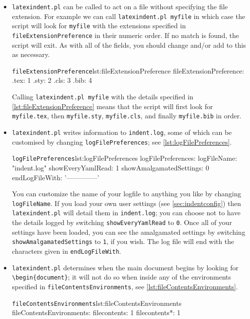 \documentclass[11pt]{article}
\newcommand{\verbitem}[1]{\small\PVerb{#1}}
\begin{document}
\begin{itemize}
	\item[\verbitem{fileExtensionPreference}] \lstinline!latexindent.pl! can be called to
	      act on a file without
	      specifying the file extension.  For example we can call \lstinline!latexindent.pl myfile!
	      in which case the script will look for \lstinline!myfile! with the extensions
	      specified in \lstinline!fileExtensionPreference! in their numeric order. If
	      no match is found, the script will exit. As with all of the fields, you should
	      change and/or add to this as necessary.
	      \begin{cmhlistings}[style=yaml]{\lstinline!fileExtensionPreference!}{lst:fileExtensionPreference}
fileExtensionPreference:
    .tex: 1
    .sty: 2
    .cls: 3
    .bib: 4
	\end{cmhlistings}
	Calling \lstinline!latexindent.pl myfile! with the details specified in \cref{lst:fileExtensionPreference}
	means that the script will first look for \lstinline!myfile.tex!, then \lstinline!myfile.sty!, \lstinline!myfile.cls!, 
    and finally \lstinline!myfile.bib! in order.
\item[\verbitem{logFilePreferences}] 
  \lstinline!latexindent.pl! writes information to \lstinline!indent.log!, some 
  of which can be customised by changing \lstinline!logFilePreferences!; see \cref{lst:logFilePreferences}.
\begin{cmhlistings}[style=yaml]{\lstinline!logFilePreferences!}{lst:logFilePreferences}
logFilePreferences:
    logFileName: "indent.log"
    showEveryYamlRead: 1
    showAmalgamatedSettings: 0
    endLogFileWith: '--------------' 
  \end{cmhlistings}
  You can customize the name of your logfile to anything you like by changing \lstinline!logFileName!.
If you load your own user settings (see \vref{sec:indentconfig}) then \lstinline!latexindent.pl! will
detail them in \lstinline!indent.log!; you can choose not to have the details logged by switching
\lstinline!showEveryYamlRead! to \lstinline!0!. Once all of your settings have 
been loaded, you can see the amalgamated settings by switching \lstinline!showAmalgamatedSettings! 
to \lstinline!1!, if you wish. The log file will end with the characters 
given in \lstinline!endLogFileWith!.

\item[\verbitem{fileContentsEnvironments}] 
  \lstinline!latexindent.pl! determines when the main document begins by looking for \lstinline!\begin{document}!; 
  it will not do so when inside any of the environments specified in \lstinline!fileContentsEnvironments!, see
  \cref{lst:fileContentsEnvironments}.
\begin{cmhlistings}[style=yaml]{\lstinline!fileContentsEnvironments!}{lst:fileContentsEnvironments}
fileContentsEnvironments:
    filecontents: 1
    filecontents*: 1
  \end{cmhlistings}


\end{itemize}
\end{document}
